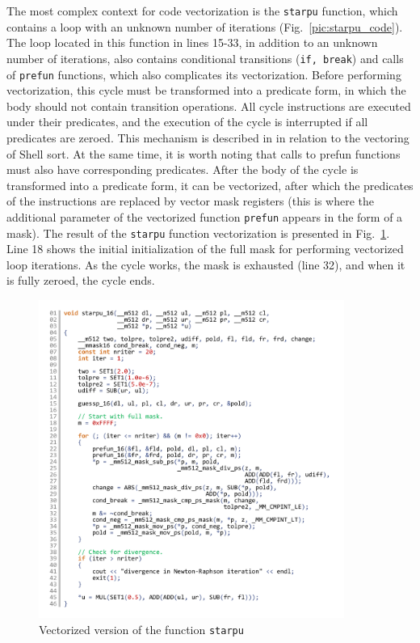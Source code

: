 \documentclass[utf8,english]{psta}%
\begin{document}
The most complex context for code vectorization is the \texttt{starpu} function, which contains a loop with an unknown number of iterations (Fig.~\ref{pic:starpu_code}).
The loop located in this function in lines 15-33, in addition to an unknown number of iterations, also contains conditional transitions (\texttt{if, break}) and calls of \texttt{prefun} functions, which also complicates its vectorization.
Before performing vectorization, this cycle must be transformed into a predicate form, in which the body should not contain transition operations.
All cycle instructions are executed under their predicates, and the execution of the cycle is interrupted if all predicates are zeroed.
This mechanism is described in \cite{RybTelShabLoopsVect} in relation to the vectoring of Shell sort.
At the same time, it is worth noting that calls to prefun functions must also have corresponding predicates.
After the body of the cycle is transformed into a predicate form, it can be vectorized, after which the predicates of the instructions are replaced by vector mask registers (this is where the additional parameter of the vectorized function \texttt{prefun} appears in the form of a mask).
The result of the \texttt{starpu} function vectorization is presented in Fig.~\ref{pic:starpu_16_code}.
Line 18 shows the initial initialization of the full mask for performing vectorized loop iterations. As the cycle works, the mask is exhausted (line 32), and when it is fully zeroed, the cycle ends.

\begin{figure}
\includegraphics[width=10cm]{pics/pic_starpu_16_code}
\caption{Vectorized version of the function \texttt{starpu}}
\label{pic:starpu_16_code}
\end{figure}
\end{document}
